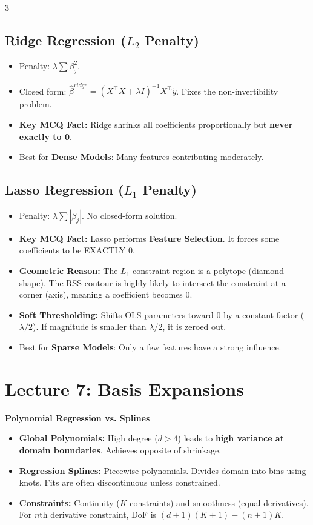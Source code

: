 \documentclass[10pt,landscape]{article}
\begin{document}
\begin{multicols*}{3}
\subsection*{Ridge Regression ($L_2$ Penalty)}
\begin{itemize}
    \item Penalty: $\lambda \sum \beta_j^2$. 
    \item Closed form: $\hat{\beta}^{ridge} = (X^\top X + \lambda I)^{-1}X^\top \tilde{y}$. Fixes the non-invertibility problem.
    \item \textbf{Key MCQ Fact:} Ridge shrinks all coefficients proportionally but \textbf{never exactly to 0}. 
    \item Best for \textbf{Dense Models}: Many features contributing moderately.
\end{itemize}

\subsection*{Lasso Regression ($L_1$ Penalty)}
\begin{itemize}
    \item Penalty: $\lambda \sum |\beta_j|$. No closed-form solution.
    \item \textbf{Key MCQ Fact:} Lasso performs \textbf{Feature Selection}. It forces some coefficients to be EXACTLY 0.
    \item \textbf{Geometric Reason:} The $L_1$ constraint region is a polytope (diamond shape). The RSS contour is highly likely to intersect the constraint at a corner (axis), meaning a coefficient becomes 0.
    \item \textbf{Soft Thresholding:} Shifts OLS parameters toward 0 by a constant factor ($\lambda/2$). If magnitude is smaller than $\lambda/2$, it is zeroed out.
    \item Best for \textbf{Sparse Models}: Only a few features have a strong influence.
\end{itemize}

\section{Lecture 7: Basis Expansions}
\textbf{Polynomial Regression vs. Splines}
\begin{itemize}
    \item \textbf{Global Polynomials:} High degree ($d > 4$) leads to \textbf{high variance at domain boundaries}. Achieves opposite of shrinkage.
    \item \textbf{Regression Splines:} Piecewise polynomials. Divides domain into bins using knots. Fits are often discontinuous unless constrained.
    \item \textbf{Constraints:} Continuity ($K$ constraints) and smoothness (equal derivatives). For $n$th derivative constraint, DoF is $(d+1)(K+1) - (n+1)K$.
\end{itemize}


\end{multicols*}
\end{document}
